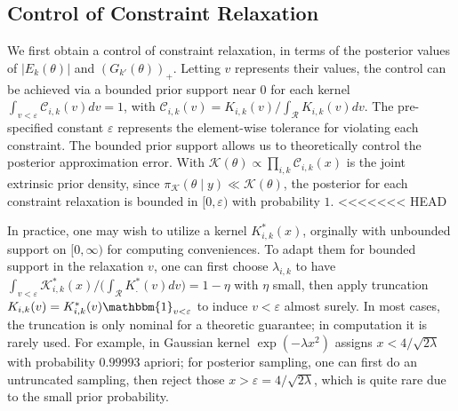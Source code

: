 \documentclass[10pt]{article}
\newcommand{\mc}[1]{\mathcal{#1}}
\DeclareMathOperator{\1}{\mathbbm{1}}
\begin{document}
%

\subsection{Control of Constraint Relaxation}

We first obtain a control of constraint relaxation, in terms of the posterior values of $|E_k(\theta)|$ and $(G_{k'}(\theta))_+$. Letting $v$ represents their values, the control can be achieved via a bounded prior support near $0$ for each kernel $\int_{v<\varepsilon} \mc C_{i,k}(v)  dv= 1$, with  $\mc C_{i,k}(v) = K_{i,k}(v) / \int_{\mc R}K_{i,k}(v) dv$. The pre-specified constant $\varepsilon$ represents the element-wise tolerance for violating each constraint. The bounded prior support allows us to theoretically control the posterior approximation error. With $\mc K(\theta) \propto \prod_{i,k} \mc C_{i,k}(x)$ is the joint extrinsic prior density, since $\pi_{\mc K}(\theta \mid y) \ll \mc K(\theta)$, the posterior for each constraint relaxation is bounded in $[0,\varepsilon)$ with probability $1$.
<<<<<<< HEAD

In practice, one may wish to utilize a kernel $K^*_{i,k}(x)$, orginally with unbounded support on $[0,\infty)$ for computing conveniences. To adapt them for bounded support in the relaxation $v$, one can first choose $\lambda_{i,k}$ to have $\int_{v<\varepsilon} \mc K^*_{i,k}(x)/ \big( \int_{\mc R} K^*_{.}(v) dv\big ) = 1-\eta$ with $\eta$ small, then apply truncation $K_{i,k}(v)= K^*_{i,k}(v) \mathbbm{1}_{v<\varepsilon}$ to induce $v<\varepsilon$ almost surely. In most cases, the truncation is only nominal for a theoretic guarantee; in computation it is rarely used. For example, in Gaussian kernel $\exp( -{\lambda x^2})$ assigns $x<4/\sqrt{2\lambda}$ with probability $0.99993$ apriori; for posterior sampling, one can first do an untruncated sampling, then reject those $x>\varepsilon=4/\sqrt{2\lambda}$, which is quite rare due to the small prior probability. 
\end{document}
